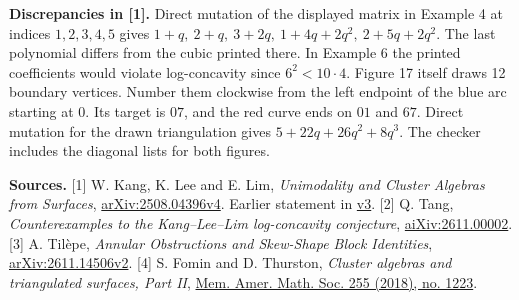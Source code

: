 \documentclass[11pt]{article}
\begin{document}
\textbf{Discrepancies in [1].}
Direct mutation of the displayed matrix in Example 4 at indices \(1,2,3,4,5\) gives \(1+q,\ 2+q,\ 3+2q,\ 1+4q+2q^2,\ 2+5q+2q^2\). The last polynomial differs from the cubic printed there. In Example 6 the printed coefficients would violate log-concavity since \(6^2<10\cdot4\). Figure 17 itself draws 12 boundary vertices. Number them clockwise from the left endpoint of the blue arc starting at \(0\). Its target is \(07\), and the red curve ends on \(01\) and \(67\). Direct mutation for the drawn triangulation gives \(5+22q+26q^2+8q^3\). The checker includes the diagonal lists for both figures.

\small\raggedright
\textbf{Sources.}
[1] W. Kang, K. Lee and E. Lim, \emph{Unimodality and Cluster Algebras from Surfaces}, \href{https://arxiv.org/abs/2508.04396v4}{arXiv:2508.04396v4}. Earlier statement in \href{https://arxiv.org/abs/2508.04396v3}{v3}.
[2] Q. Tang, \emph{Counterexamples to the Kang--Lee--Lim log-concavity conjecture}, \href{https://aixiv.online/abs/2611.00002}{aiXiv:2611.00002}.
[3] A. Til\`epe, \emph{Annular Obstructions and Skew-Shape Block Identities}, \href{https://arxiv.org/abs/2611.14506v2}{arXiv:2611.14506v2}.
[4] S. Fomin and D. Thurston, \emph{Cluster algebras and triangulated surfaces, Part II}, \href{https://doi.org/10.1090/memo/1223}{Mem. Amer. Math. Soc. 255 (2018), no. 1223}.
\end{document}
